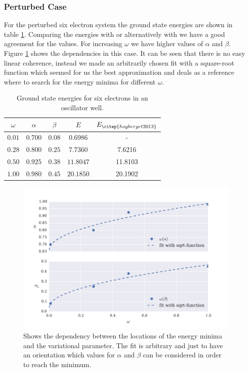\subsubsection{Perturbed Case}\label{sec:perturbed_six}
For the perturbed six electron system the ground state energies are shown in table \ref{tab:groundstate_sixelectron}. Comparing the energies with \citet{hogberget2013} or alternatively with \citet{lohne2011} we have a good agreement for the values. For increasing $\omega$ we have higher values of $\alpha$ and $\beta$. Figure \ref{fig:alpha_beta_omega} shows the dependencies in this case. It can be seen that there is no easy linear coherence, instead we made an arbitrarily chosen fit with a square-root function which seemed for us the best approximation and deals as a reference where to search for the energy minima for different $\omega$. 
\begin{table}
    \centering
    \caption{Ground state energies for six electrons in an oscillator well.}
    \begin{tabular}{c|cc|c|c}
    \toprule
    $\omega$   & $\alpha$    & $\beta$ &    $E$  & $E_{\citep{hogberget2013}}$  \\ 
    \midrule
    $0.01$     & $0.700$       & $0.08$  & $0.6986$ & - \\
    $0.28$     & $0.800$       & $0.25$  & $7.7360$  & 7.6216 \\
    $0.50$      & $0.925$	    & $0.38$  & $11.8047$ & 11.8103 \\
    $1.00$     & $0.980$      & $0.45$  & $20.1850$ & 20.1902 \\
    \bottomrule
    \end{tabular}
    \label{tab:groundstate_sixelectron}
\end{table}
\begin{figure}[htbp]
    \centering
    \includegraphics[scale=0.7]{alpha_beta_omega.pdf}
    \caption{Shows the dependency between the locations of the energy minima and the variational parameter. The fit is arbitrary and just to have an orientation which values for $\alpha$ and $\beta$ can be considered in order to reach the minimum.}
    \label{fig:alpha_beta_omega}
\end{figure}


